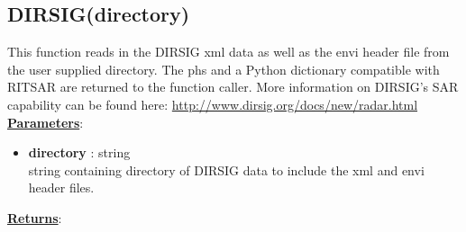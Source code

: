 \documentclass{article}
\newcommand{\defs}[2]{\textbf{{#1}} : {#2}}
\begin{document}
\subsection{DIRSIG(directory)}
This function reads in the DIRSIG xml data as well as the envi header file from the user supplied directory. The phs and a Python dictionary compatible with RITSAR are returned to the function caller.  More information on DIRSIG's SAR capability can be found here: \url{http://www.dirsig.org/docs/new/radar.html}\\

\noindent \underline{\textbf{Parameters}}:
\begin{itemize}
  	\item \defs{directory}{string}\\
  		string containing directory of DIRSIG data to include the xml and envi header files.
\end{itemize}
\noindent \underline{\textbf{Returns}}:
\end{document}
